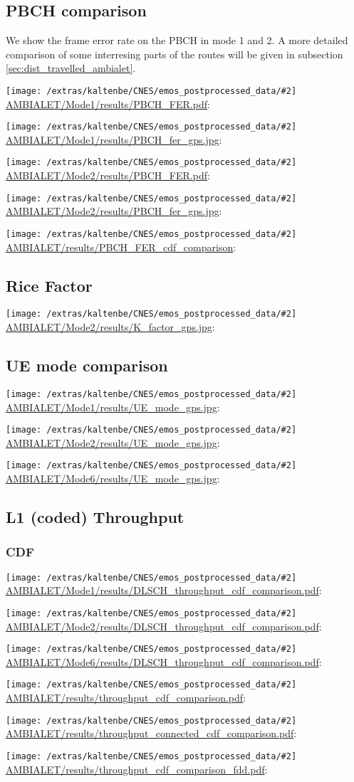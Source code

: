 \documentclass[a4paper,10pt]{article}
\newcommand{\printfile}[2][]{
 \begin{minipage}{8cm}
  \centering
  \texttt{[image: /extras/kaltenbe/CNES/emos\_postprocessed\_data/\#2]}
  \url{#2}: #1

 \end{minipage}
}
\begin{document}
\subsection{PBCH comparison}
We show the frame error rate on the PBCH in mode 1 and 2. A more detailed comparison of some interresing parts of the routes will be given in subsection \ref{sec:dist_travelled_ambialet}.

\printfile{AMBIALET/Mode1/results/PBCH_FER.pdf}
\printfile{AMBIALET/Mode1/results/PBCH_fer_gps.jpg}

\printfile{AMBIALET/Mode2/results/PBCH_FER.pdf}
\printfile{AMBIALET/Mode2/results/PBCH_fer_gps.jpg}

\printfile{AMBIALET/results/PBCH_FER_cdf_comparison}

\subsection{Rice Factor}

\printfile{AMBIALET/Mode2/results/K_factor_gps.jpg}

\subsection{UE mode comparison}

\printfile{AMBIALET/Mode1/results/UE_mode_gps.jpg}
\printfile{AMBIALET/Mode2/results/UE_mode_gps.jpg}

\printfile{AMBIALET/Mode6/results/UE_mode_gps.jpg}

\subsection{L1 (coded) Throughput}


\subsubsection{CDF}

\printfile{AMBIALET/Mode1/results/DLSCH_throughput_cdf_comparison.pdf}
\printfile{AMBIALET/Mode2/results/DLSCH_throughput_cdf_comparison.pdf}

\printfile{AMBIALET/Mode6/results/DLSCH_throughput_cdf_comparison.pdf}

\printfile{AMBIALET/results/throughput_cdf_comparison.pdf}
\printfile{AMBIALET/results/throughput_connected_cdf_comparison.pdf}

\printfile{AMBIALET/results/throughput_cdf_comparison_fdd.pdf}
\end{document}
